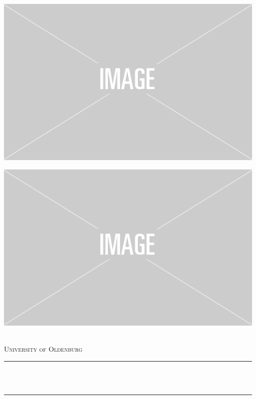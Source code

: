 
\begin{titlepage}
	\centering
    \vspace*{0.5 cm}
    
    \begin{minipage}[c]{.45\textwidth}
    \includegraphics[scale=1.1]{Pictures/placeholder.png}	%
    \end{minipage}\hfill
    \begin{minipage}[c]{.45\textwidth}
    \includegraphics[scale=0.2]{Pictures/placeholder.png}
    \end{minipage}
    \\[1.0cm]
    \textsc{\LARGE University of Oldenburg}\\[1.0 cm]	%
	\rule{\linewidth}{0.2 mm} \\[0.4 cm]
	{ \Large \bfseries \thetitle}\\
	\rule{\linewidth}{0.2 mm} \\[1.5 cm]
	

\end{titlepage}
